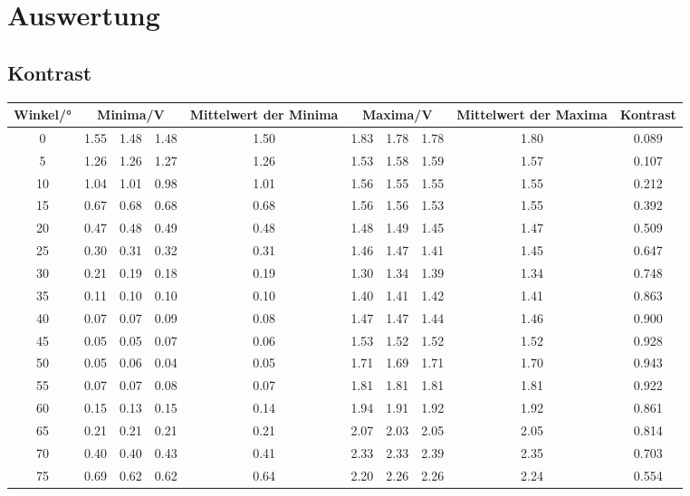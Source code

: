 \section{Auswertung}
\label{sec:Auswertung}



\subsection{Kontrast}

\begin{sidewaystable}
\begin{tabular}{c c c c c c c c c c}
    \toprule
        Winkel/°&\multicolumn{3}{c}{Minima/V}&Mittelwert der Minima&\multicolumn{3}{c}{Maxima/V}&Mittelwert der Maxima&Kontrast \\
    \midrule
      0& 1.55 & 1.48 & 1.48 & 1.50 & 1.83 & 1.78 & 1.78 & 1.80 & 0.089 \\
      5& 1.26 & 1.26 & 1.27 & 1.26 & 1.53 & 1.58 & 1.59 & 1.57 & 0.107 \\
     10& 1.04 & 1.01 & 0.98 & 1.01 & 1.56 & 1.55 & 1.55 & 1.55 & 0.212 \\
     15& 0.67 & 0.68 & 0.68 & 0.68 & 1.56 & 1.56 & 1.53 & 1.55 & 0.392 \\
     20& 0.47 & 0.48 & 0.49 & 0.48 & 1.48 & 1.49 & 1.45 & 1.47 & 0.509 \\
     25& 0.30 & 0.31 & 0.32 & 0.31 & 1.46 & 1.47 & 1.41 & 1.45 & 0.647 \\
     30& 0.21 & 0.19 & 0.18 & 0.19 & 1.30 & 1.34 & 1.39 & 1.34 & 0.748 \\
     35& 0.11 & 0.10 & 0.10 & 0.10 & 1.40 & 1.41 & 1.42 & 1.41 & 0.863 \\
     40& 0.07 & 0.07 & 0.09 & 0.08 & 1.47 & 1.47 & 1.44 & 1.46 & 0.900 \\
     45& 0.05 & 0.05 & 0.07 & 0.06 & 1.53 & 1.52 & 1.52 & 1.52 & 0.928 \\
     50& 0.05 & 0.06 & 0.04 & 0.05 & 1.71 & 1.69 & 1.71 & 1.70 & 0.943 \\
     55& 0.07 & 0.07 & 0.08 & 0.07 & 1.81 & 1.81 & 1.81 & 1.81 & 0.922 \\
     60& 0.15 & 0.13 & 0.15 & 0.14 & 1.94 & 1.91 & 1.92 & 1.92 & 0.861 \\
     65& 0.21 & 0.21 & 0.21 & 0.21 & 2.07 & 2.03 & 2.05 & 2.05 & 0.814 \\
     70& 0.40 & 0.40 & 0.43 & 0.41 & 2.33 & 2.33 & 2.39 & 2.35 & 0.703 \\
     75& 0.69 & 0.62 & 0.62 & 0.64 & 2.20 & 2.26 & 2.26 & 2.24 & 0.554 \\

\end{tabular}
\end{sidewaystable}
